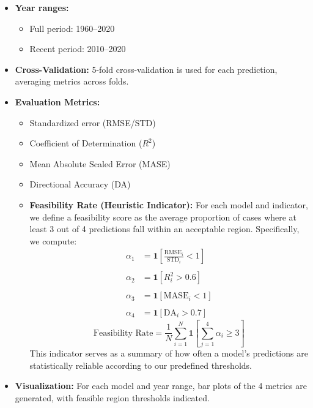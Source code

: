 \documentclass[12pt]{article}
\begin{document}
\begin{itemize}
    \item \textbf{Year ranges:}
    \begin{itemize}
        \item Full period: 1960--2020
        \item Recent period: 2010--2020
    \end{itemize}
    \item \textbf{Cross-Validation:} 5-fold cross-validation is used for each prediction, averaging metrics across folds.
    \item \textbf{Evaluation Metrics:}
    \begin{itemize}
        \item Standardized error (RMSE/STD)
        \item Coefficient of Determination ($R^2$)
        \item Mean Absolute Scaled Error (MASE)
        \item Directional Accuracy (DA)
        \item \textbf{Feasibility Rate (Heuristic Indicator):} For each model and indicator, we define a feasibility score as the average proportion of cases where at least 3 out of 4 predictions fall within an acceptable region. Specifically, we compute:
        \begin{align*}
        \alpha_1 &= \mathbf{1}\left[\frac{\text{RMSE}_i}{\text{STD}_i} < 1\right] \\\\
        \alpha_2 &= \mathbf{1}\left[R_i^2 > 0.6\right] \\\\
        \alpha_3 &= \mathbf{1}\left[\text{MASE}_i < 1\right] \\\\
        \alpha_4 &= \mathbf{1}\left[\text{DA}_i > 0.7\right]
        \end{align*}
        \[
        \text{Feasibility Rate} = \frac{1}{N} \sum_{i=1}^N \mathbf{1}\left[ \sum_{j=1}^4 \alpha_i \geq 3\right]
        \]
        This indicator serves as a summary of how often a model’s predictions are statistically reliable according to our predefined thresholds.
    \end{itemize}
    \item \textbf{Visualization:} For each model and year range, bar plots of the 4 metrics are generated, with feasible region thresholds indicated.
\end{itemize}
\end{document}

